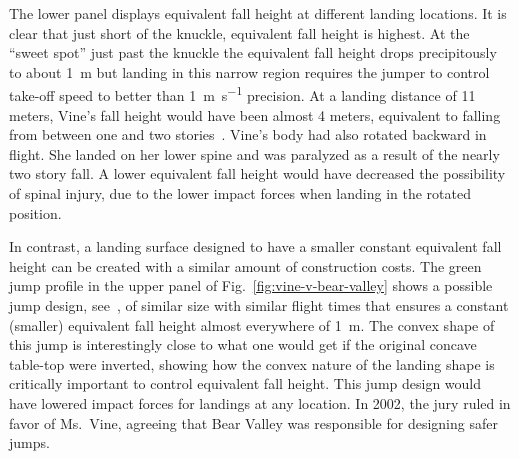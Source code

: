 \documentclass[smallextended]{svjour3}       %
\begin{document}
The lower panel displays equivalent fall height at different landing locations.
It is clear that just short of the knuckle, equivalent fall height is highest.
At the ``sweet spot'' just past the knuckle the equivalent fall height drops
precipitously to  about 1~\si{\meter} but landing in this narrow region
requires the jumper to control take-off speed to better than
1~\si{\meter\per\second} precision. At a landing distance of 11 meters, Vine's
fall height would have been almost 4 meters, equivalent to falling from between
one and two stories~\cite{Vish2005}. Vine's body had also rotated backward in
flight. She landed on her lower spine and was paralyzed as a result of the
nearly two story fall. A lower equivalent fall height would have decreased the
possibility of spinal injury, due to the lower impact forces when landing in
the rotated position.

In contrast, a landing surface designed to have a smaller constant equivalent
fall height can be created with a similar amount of construction costs. The
green jump profile in the upper panel of Fig.~\ref{fig:vine-v-bear-valley}
shows a possible jump design, see~\cite{Levy2015}, of similar size with similar
flight times that ensures a constant (smaller) equivalent fall height almost
everywhere of 1~\si{\meter}. The convex shape of this jump is interestingly
close to what one would get if the original concave table-top were inverted,
showing how the convex nature of the landing shape is critically important to
control equivalent fall height. This jump design would have lowered impact
forces for landings at any location. In 2002, the jury ruled in favor of
Ms.~Vine, agreeing that Bear Valley was responsible for designing safer jumps.
\end{document}
